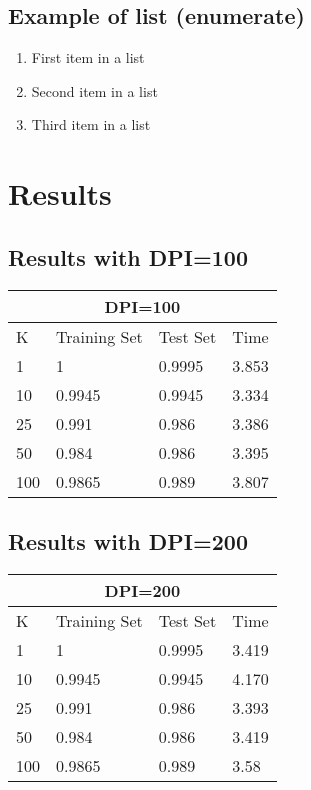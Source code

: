 \documentclass[paper=a4, fontsize=11pt]{scrartcl} %
\numberwithin{equation}{section} %
\numberwithin{figure}{section} %
\numberwithin{table}{section} %
\begin{document}

\subsection{Example of list (enumerate)}
\begin{enumerate}
\item First item in a list 
\item Second item in a list 
\item Third item in a list
\end{enumerate}


\section*{Results}

\subsection*{Results with DPI=100}
\begin{tabular}{ |p{3cm}|p{3cm}|p{3cm}|p{3cm}|  }
 \hline
 \multicolumn{4}{|c|}{DPI=100} \\
 \hline
 K & Training Set & Test Set & Time\\
 \hline
 1 & 1 & 0.9995 & 3.853\\
 10 & 0.9945 & 0.9945 & 3.334\\
 25 & 0.991 & 0.986 & 3.386\\
 50 & 0.984 & 0.986 & 3.395\\
 100 & 0.9865 & 0.989 & 3.807\\
 \hline
\end{tabular}

\subsection*{Results with DPI=200}
\begin{tabular}{ |p{3cm}|p{3cm}|p{3cm}|p{3cm}|  }
 \hline
 \multicolumn{4}{|c|}{DPI=200} \\
 \hline
 K & Training Set & Test Set & Time\\
 \hline
 1 & 1 & 0.9995 & 3.419\\
 10 & 0.9945 & 0.9945 & 4.170\\
 25 & 0.991 & 0.986 & 3.393\\
 50 & 0.984 & 0.986 & 3.419\\
 100 & 0.9865 & 0.989 & 3.58\\
 \hline
\end{tabular}
\end{document}
